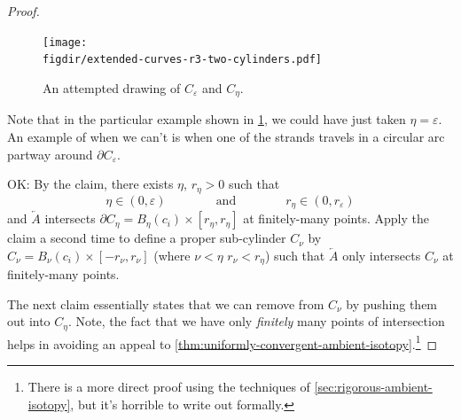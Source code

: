 \begin{proof}
\begin{leftbar}
  \end{leftbar}
  \begin{figure}[H]
    \centering
    \texttt{[image: \\figdir/extended-curves-r3-two-cylinders.pdf]}
    \caption{An attempted drawing of $C_\varepsilon$ and $C_\eta$.
    }
    \label{fig:the-cylinders}
  \end{figure}
  \begin{remark}
    Note that in the particular example shown in
    \cref{fig:the-cylinders}, we could have just taken $\eta =
    \varepsilon$. An example of when we can't is when one of the
    strands travels in a circular arc partway around $\partial
    C_\varepsilon$.
  \end{remark}


  OK: By the claim, there exists $\eta$, $r_\eta > 0$ such that
  \[
    \eta \in (0, \varepsilon) \qquad\qquad \text{and} \qquad\qquad
    r_\eta \in (0,r_\varepsilon)
  \]
  and $\overleftarrow{A}$ intersects $\partial C_\eta = B_{\eta}(c_i)
  \times [r_\eta, r_\eta]$ at finitely-many points. Apply the claim a
  second time to define a proper sub-cylinder $C_\nu$ by $C_\nu =
  B_{\nu}(c_i) \times [-r_\nu, r_\nu]$ (where $\nu < \eta$ $r_\nu <
  r_\eta$) such that $\overleftarrow{A}$ only intersects $C_\nu$ at
  finitely-many points.


  The next claim essentially states that we can remove  from $C_\nu$ by pushing
  them out into $C_\eta$. Note, the fact that we have only
  \emph{finitely} many points of intersection helps in avoiding an
  appeal to
  \cref{thm:uniformly-convergent-ambient-isotopy}.\footnote{There is a
    more direct proof using the techniques of
    \cref{sec:rigorous-ambient-isotopy}, but it's horrible to write
    out formally.}




\end{proof}
